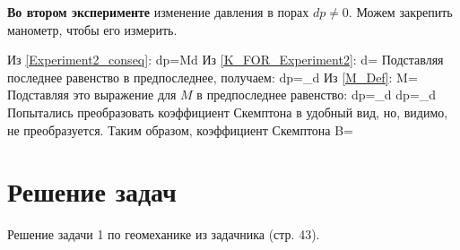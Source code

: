 \documentclass[main.tex]{subfiles}
\begin{document}
\textbf{Во втором эксперименте} изменение давления в порах $dp\neq0$. Можем закрепить манометр, чтобы его измерить.

Из \eqref{Experiment2_conseq}:
\beq
dp=\alpha Md\varepsilon
\eeq
Из \eqref{K_FOR_Experiment2}:
\beq
d\varepsilon=
\eeq
Подставляя последнее равенство в предпоследнее, получаем:
\beq
dp=_{}d\sigma
\eeq
Из \eqref{M_Def}:
\beq
M=
\eeq
Подставляя это выражение для $M$ в предпоследнее равенство:
\beq
dp=_{}d\sigma
\eeq
 \beq
 dp=_{}d\sigma
 \eeq
 Попытались преобразовать коэффициент Скемптона в удобный вид, но, видимо, не преобразуется. Таким образом, коэффициент Скемптона
 \beq
 B=
 \eeq
 

\section{Решение задач}
Решение задачи 1 по геомеханике из задачника (стр. 43).
\end{document}
